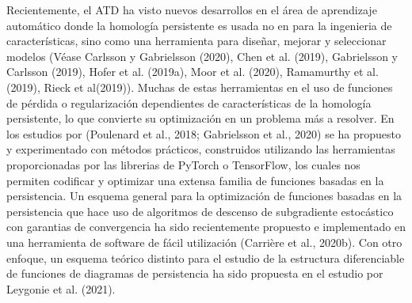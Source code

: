 Recientemente, el ATD ha visto nuevos desarrollos en el \'area de aprendizaje
autom\'atico donde la homolog\'ia persistente es usada no en para la ingenieria de
caracter\'isticas, sino como una herramienta para dise\~{n}ar,
mejorar y seleccionar modelos (V\'ease
Carlsson y Gabrielsson (2020)\cite{Carlsson2020},
Chen et al. (2019)\cite{Chen2019},
Gabrielsson y Carlsson (2019)\cite{Gabrielsson2019},
Hofer et al. (2019a)\cite{Hofer2019a},
Moor et al. (2020)\cite{Moor2020},
Ramamurthy et al. (2019)\cite{Rama2019}, Rieck et al(2019)\cite{Rieck2019}).
Muchas de estas herramientas en el uso de funciones de p\'erdida o regularizaci\'on
dependientes de caracter\'isticas de la homolog\'ia persistente,
lo que convierte su optimizaci\'on en un problema m\'as a resolver.
En los estudios por
(Poulenard et al., 2018\cite{Poulenard2018}; Gabrielsson et al., 2020\cite{Gabrielsson2020})
se ha propuesto y experimentado con m\'etodos pr\'acticos,
construidos utilizando las herramientas proporcionadas por
las librerias de PyTorch o TensorFlow,
los cuales nos permiten codificar y optimizar una extensa familia de funciones
basadas en la persistencia.
Un esquema general para la optimizaci\'on de funciones basadas en la persistencia
que hace uso de algoritmos de descenso de subgradiente estoc\'astico
con garantias de convergencia ha sido recientemente propuesto e implementado en una
herramienta de software de f\'acil utilizaci\'on (Carri\`ere et al., 2020b\cite{Carriere2020b}).
Con otro enfoque, un esquema te\'orico distinto para el estudio de la estructura diferenciable
de funciones de diagramas de persistencia ha sido propuesta en el estudio por
Leygonie et al. (2021)\cite{Ley2021}.
